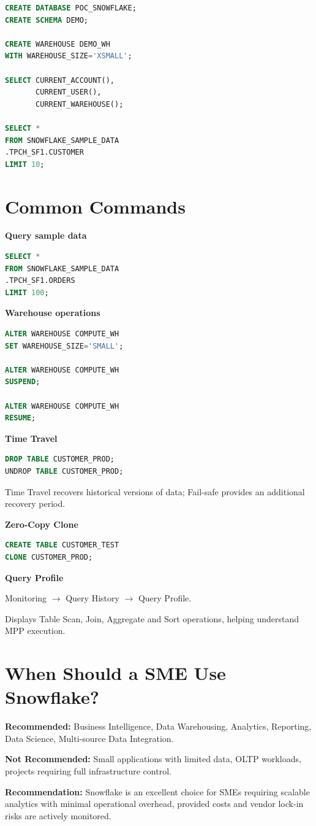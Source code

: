 \documentclass[9pt,a4paper]{article}
\begin{document}
\begin{lstlisting}[language=SQL]
CREATE DATABASE POC_SNOWFLAKE;
CREATE SCHEMA DEMO;

CREATE WAREHOUSE DEMO_WH
WITH WAREHOUSE_SIZE='XSMALL';

SELECT CURRENT_ACCOUNT(),
       CURRENT_USER(),
       CURRENT_WAREHOUSE();

SELECT *
FROM SNOWFLAKE_SAMPLE_DATA
.TPCH_SF1.CUSTOMER
LIMIT 10;
\end{lstlisting}
\section{Common Commands}

\textbf{Query sample data}

\begin{lstlisting}[language=SQL]
SELECT *
FROM SNOWFLAKE_SAMPLE_DATA
.TPCH_SF1.ORDERS
LIMIT 100;
\end{lstlisting}

\textbf{Warehouse operations}

\begin{lstlisting}[language=SQL]
ALTER WAREHOUSE COMPUTE_WH
SET WAREHOUSE_SIZE='SMALL';

ALTER WAREHOUSE COMPUTE_WH
SUSPEND;

ALTER WAREHOUSE COMPUTE_WH
RESUME;
\end{lstlisting}

\textbf{Time Travel}

\begin{lstlisting}[language=SQL]
DROP TABLE CUSTOMER_PROD;
UNDROP TABLE CUSTOMER_PROD;
\end{lstlisting}

Time Travel recovers historical versions of data; Fail-safe provides an additional recovery period.

\textbf{Zero-Copy Clone}

\begin{lstlisting}[language=SQL]
CREATE TABLE CUSTOMER_TEST
CLONE CUSTOMER_PROD;
\end{lstlisting}

\textbf{Query Profile}

Monitoring $\rightarrow$ Query History $\rightarrow$ Query Profile.

Displays Table Scan, Join, Aggregate and Sort operations, helping understand MPP execution.

\section{When Should a SME Use Snowflake?}

\textbf{Recommended:} Business Intelligence, Data Warehousing, Analytics, Reporting, Data Science, Multi-source Data Integration.

\textbf{Not Recommended:} Small applications with limited data, OLTP workloads, projects requiring full infrastructure control.

\textbf{Recommendation:} Snowflake is an excellent choice for SMEs requiring scalable analytics with minimal operational overhead, provided costs and vendor lock-in risks are actively monitored.
\end{document}
